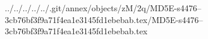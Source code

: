 ../../../../../.git/annex/objects/zM/2q/MD5E-s4476--3cb76bf3f9a71f4ea1e3145fd1ebebab.tex/MD5E-s4476--3cb76bf3f9a71f4ea1e3145fd1ebebab.tex